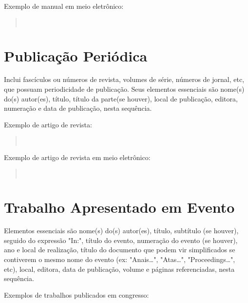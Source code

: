 \documentclass[repeatfields,xlists,xpacks,oneside,yearsonly]{ufrgscca}
\begin{document}
\begin{appendix}
        Exemplo de manual em meio eletrônico:\\

        \begin{quote}\noindent{}\\\end{quote}


        \section{Publicação Periódica}

        Inclui fascículos ou números de revista, volumes de série, números de
        jornal, etc, que possuam periodicidade de publicação. Seus elementos
        essenciais são nome(s) do(s) autor(es), título, título da parte(se houver),
        local de publicação, editora, numeração e data de publicação, nesta
        sequência.

        Exemplo de artigo de revista:\\

        \begin{quote}\noindent{}\\\end{quote}

        Exemplo de artigo de revista em meio eletrônico:\\

        \begin{quote}\noindent{}\\\end{quote}



        \section{Trabalho Apresentado em Evento}

        Elementos essenciais são nome(s) do(s) autor(es), título, subtítulo (se
        houver), seguido do expressão "In:", título do evento, numeração do evento
        (se houver), ano e local de realização, título do documento que podem vir
        simplificados se contiverem o mesmo nome do evento (ex: "Anais\ldots",
        "Atas\ldots", "Proceedings\ldots", etc), local, editora, data de publicação,
        volume e páginas referenciadas, nesta sequência.

        Exemplos de trabalhos publicados em congresso:\\


\end{appendix}
\end{document}
